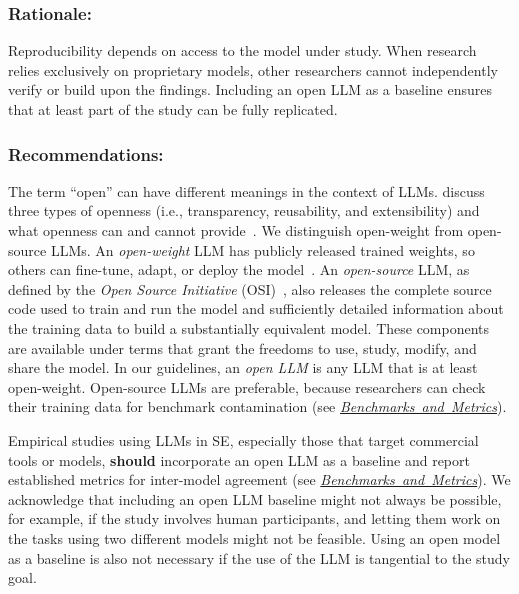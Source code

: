 \documentclass[smallextended]{svjour3}
\newcommand{\should}{\textbf{should}\xspace}
\newcommand{\benchmarksmetrics}{\hyperref[sec:use-suitable-baselines-benchmarks-and-metrics]{\mbox{\emph{Benchmarks and Metrics}}}\xspace}
\newcommand{\benchmarksmetrics}{\href{/guidelines/benchmarks-metrics/}{\emph{Benchmarks and Metrics}}\xspace}
\newcommand{\guidelinesubsubsection}[1]{\subsubsection{\bfseries #1:}}
\newcommand{\guidelinesubsubsection}[1]{\subsubsection{#1}}
\begin{document}
\guidelinesubsubsection{Rationale}

Reproducibility depends on access to the model under study.
When research relies exclusively on proprietary models, other researchers cannot independently verify or build upon the findings.
Including an open LLM as a baseline ensures that at least part of the study can be fully replicated.

\guidelinesubsubsection{Recommendations}

The term ``open'' can have different meanings in the context of LLMs.
\citeauthor{widder2024open} discuss three types of openness (i.e., transparency, reusability, and extensibility) and what openness can and cannot provide~\cite{widder2024open}.
We distinguish open-weight from open-source LLMs.
An \emph{open-weight} LLM has publicly released trained weights, so others can fine-tune, adapt, or deploy the model~\cite{OSIOpenWeights}.
An \emph{open-source} LLM, as defined by the \emph{Open Source Initiative} (OSI)~\cite{OSIAI2024}, also releases the complete source code used to train and run the model and sufficiently detailed information about the training data to build a substantially equivalent model.
These components are available under terms that grant the freedoms to use, study, modify, and share the model.
In our guidelines, an \emph{open LLM} is any LLM that is at least open-weight.
Open-source LLMs are preferable, because researchers can check their training data for benchmark contamination (see \benchmarksmetrics).

Empirical studies using LLMs in SE, especially those that target commercial tools or models, \should incorporate an open LLM as a baseline and report established metrics for inter-model agreement (see \benchmarksmetrics).
We acknowledge that including an open LLM baseline might not always be possible, for example, if the study involves human participants, and letting them work on the tasks using two different models might not be feasible.
Using an open model as a baseline is also not necessary if the use of the LLM is tangential to the study goal.
\end{document}
